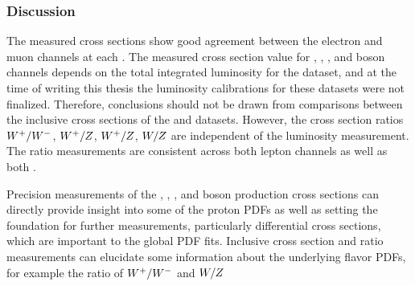 \subsubsection{Discussion}
The measured cross sections show good agreement between the electron and muon channels at each \s. The measured cross section value for \Wp, \Wm, \W, and \Z boson channels depends on the total integrated luminosity for the dataset, and at the time of writing this thesis the luminosity calibrations for these datasets were not finalized. Therefore, conclusions should not be drawn from comparisons between the inclusive cross sections of the \sg and \sh datasets. However, the cross section ratios $W^+/W^-$, $W^+/Z$, $W^+/Z$, $W/Z$ are independent of the luminosity measurement. The ratio measurements are consistent across both lepton channels as well as both \s. 

Precision measurements of the \Wp, \Wm, \W, and \Z boson production cross sections can directly provide insight into some of the proton PDFs as well as setting the foundation for further measurements, particularly differential cross sections, which are important to the global PDF fits. Inclusive cross section and ratio measurements can elucidate some information about the underlying flavor PDFs, for example the ratio of $W^+/W^-$ and $W/Z$